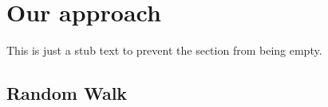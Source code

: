 \section{Our approach}
This is just a stub text to prevent the section from being empty.

\subsection{Random Walk}